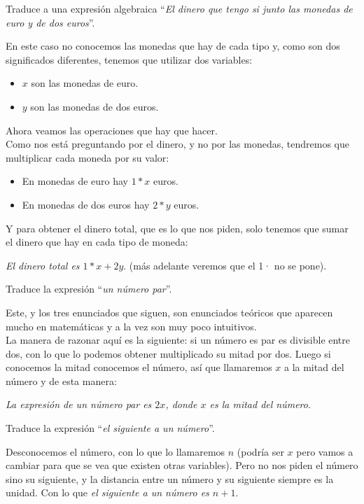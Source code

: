 \documentclass[a4paper,11pt,answers]{exam}
\begin{document}
\begin{questions}
  \question Traduce a una expresión algebraica ``\emph{El dinero que tengo si junto las monedas de euro y de dos euros}''.
    \begin{solution}
      En este caso no conocemos las monedas que hay de cada tipo y, como son dos significados diferentes, tenemos que utilizar dos variables:
      \begin{itemize}
      \item $x$ son las monedas de euro.
      \item $y$ son las monedas de dos euros.
      \end{itemize}
      Ahora veamos las operaciones que hay que hacer.\\
      Como nos está preguntando por el dinero, y no por las monedas, tendremos que multiplicar cada moneda por su valor:
      \begin{itemize}
      \item En monedas de euro hay $1*x$ euros.
      \item En monedas de dos euros hay $2*y$ euros.
      \end{itemize}
      Y para obtener el dinero total, que es lo que nos piden, solo tenemos que sumar el dinero que hay en cada tipo de moneda:
      \begin{center}
        \emph{El dinero total es $1*x+2y$}. \small (más adelante veremos que el 1· no se pone).
      \end{center}
    \end{solution}
  \question Traduce la expresión ``\emph{un número par}''.
    \begin{solution}
      Este, y los tres enunciados que siguen, son enunciados teóricos que aparecen mucho en matemáticas y a la vez son muy poco intuitivos.\\
      La manera de razonar aquí es la siguiente: si un número es par es divisible entre dos, con lo que lo podemos obtener multiplicado su mitad por dos. Luego si conocemos la mitad conocemos el número, así que llamaremos $x$ a la mitad del número y de esta manera:
      \begin{center}
        \emph{La expresión de un número par es $2x$, donde $x$ es la mitad del número}.
      \end{center}
    \end{solution}

  \question Traduce la expresión ``\emph{el siguiente a un número}''.
    \begin{solution}
      Desconocemos el número, con lo que lo llamaremos $n$ (podría ser $x$ pero vamos a cambiar para que se vea que existen otras variables).
      Pero no nos piden el número sino su siguiente, y la distancia entre un número y su siguiente siempre es la unidad. Con lo que \emph{el siguiente a un número es $n+1$}.
    \end{solution}


\end{questions}
\end{document}
